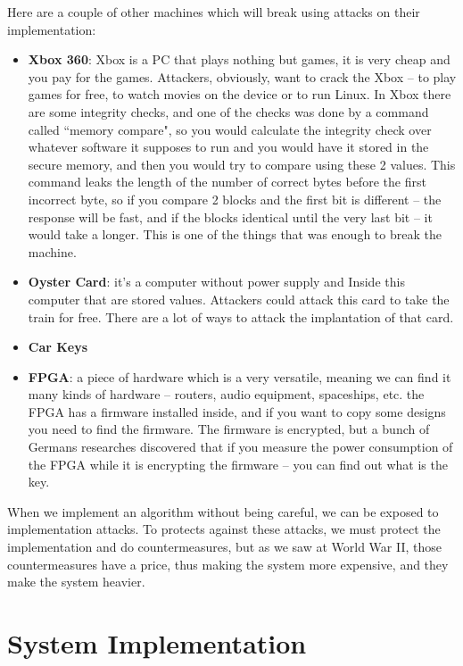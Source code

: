 Here are a couple of other machines which will break using attacks on their implementation:

\begin{itemize}
    \item \textbf{Xbox 360}: Xbox is a PC that plays nothing but games, it is very cheap and you pay for the games. Attackers, obviously, want to crack the Xbox – to play games for free, to watch movies on the device or to run Linux. In Xbox there are some integrity checks, and one of the checks was done by a command called ``memory compare"\cite{memcmp}, so you would calculate the integrity check over whatever software it supposes to run and you would have it stored in the secure memory, and then you would try to compare using these 2 values. This command leaks the length of the number of correct bytes before the first incorrect byte, so if you compare 2 blocks and the first bit is different – the response will be fast, and if the blocks identical until the very last bit – it would take a longer. This is one of the things that was enough to break the machine. 
    \item \textbf{Oyster Card}: it's a computer without power supply and Inside this computer that are stored values. Attackers could attack this card to take the train for free. There are a lot of ways to attack the implantation of that card. \cite{garcia2008dismantling, courtois2008algebraic}
    \item \textbf{Car Keys}\cite{relayAttack}
    \item \textbf{FPGA}\cite{fpga}: a piece of hardware which is a very versatile, meaning we can find it many kinds of hardware – routers, audio equipment, spaceships, etc. the FPGA has a firmware installed inside, and if you want to copy some designs you need to find the firmware. The firmware is encrypted, but a bunch of Germans researches discovered\cite{moradi2011vulnerability} that if you measure the power consumption of the FPGA while it is encrypting the firmware – you can find out what is the key.
\end{itemize}

When we implement an algorithm without being careful, we can be exposed to implementation attacks. To protects against these attacks, we must protect the implementation and do countermeasures, but as we saw at World War II, those countermeasures have a price, thus making the system more expensive, and they make the system heavier.

\section{System Implementation} \label{sec:SystemImpl}

